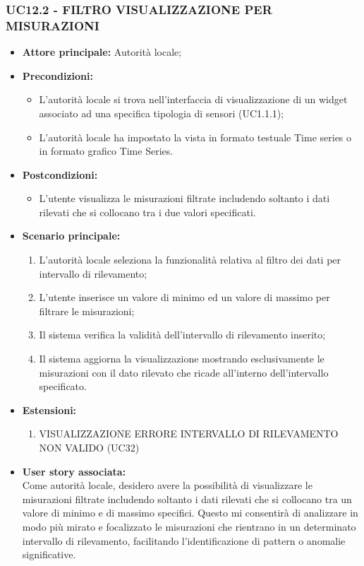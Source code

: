\subsubsection{UC12.2 - FILTRO VISUALIZZAZIONE PER MISURAZIONI}
\begin{itemize}
    \item \textbf{Attore principale:} Autorità locale;
    \item \textbf{Precondizioni:}
        \begin{itemize}
            \item L'autorità locale si trova nell'interfaccia di visualizzazione di un widget associato ad una specifica tipologia di sensori (UC1.1.1);
            \item L'autorità locale ha impostato la vista in formato testuale Time series o in formato grafico Time Series.
        \end{itemize}
    \item \textbf{Postcondizioni:}
        \begin{itemize}
            \item L'utente visualizza le misurazioni filtrate includendo soltanto i dati rilevati che si collocano tra i due valori specificati.
        \end{itemize}
    \item \textbf{Scenario principale:}
        \begin{enumerate}
            \item L'autorità locale seleziona la funzionalità relativa al filtro dei dati per intervallo di rilevamento;
            \item L'utente inserisce un valore di minimo ed un valore di massimo per filtrare le misurazioni;
            \item Il sistema verifica la validità dell'intervallo di rilevamento inserito;
            \item Il sistema aggiorna la visualizzazione mostrando esclusivamente le misurazioni con il dato rilevato che ricade all'interno dell'intervallo specificato.
        \end{enumerate}
    \item \textbf{Estensioni:}
        \begin{enumerate}
            \item VISUALIZZAZIONE ERRORE INTERVALLO DI RILEVAMENTO NON VALIDO (UC32)
        \end{enumerate}
    \item \textbf{User story associata:} \\
        Come autorità locale, desidero avere la possibilità di visualizzare le misurazioni filtrate includendo soltanto i dati rilevati che si collocano tra un valore di minimo e di massimo specifici. Questo mi consentirà di analizzare in modo più mirato e focalizzato le misurazioni che rientrano in un determinato intervallo di rilevamento, facilitando l'identificazione di pattern o anomalie significative.
\end{itemize}
